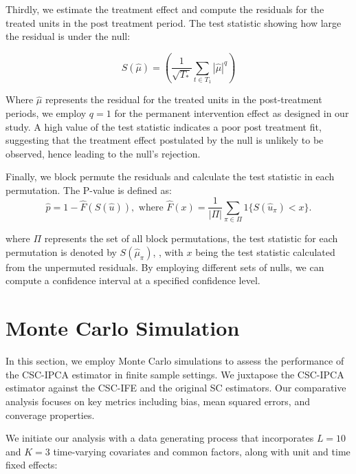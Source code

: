 \documentclass[12pt]{article}
\begin{document}
Thirdly, we estimate the treatment effect and compute the residuals for the treated units in the post treatment period. The test statistic showing how large the residual is under the null:

\begin{equation}
S(\hat{\mu}) = \left(\frac{1}{\sqrt{T_*}}\sum_{t \in T_1} |\hat{\mu}|^q \right)
\end{equation}

Where $\hat{\mu}$ represents the residual for the treated units in the post-treatment periods, we employ $q=1$ for the permanent intervention effect as designed in our study. A high value of the test statistic indicates a poor post treatment fit, suggesting that the treatment effect postulated by the null is unlikely to be observed, hence leading to the null's rejection. 

Finally, we block permute the residuals and calculate the test statistic in each permutation. The P-value is defined as:
\begin{equation}
\hat{p} = 1 - \hat{F}(S(\hat{u})), \text{ where } \hat{F}(x) = \frac{1}{|\Pi|} \sum_{\pi \in \Pi} 1\{S(\hat{u}_\pi) < x\}.
\end{equation}

\noindent where $\Pi$ represents the set of all block permutations, the test statistic for each permutation is denoted by $S(\hat{\mu}_{\pi})$, , with $x$ being the test statistic calculated from the unpermuted residuals. By employing different sets of nulls, we can compute a confidence interval at a specified confidence level.

\section{Monte Carlo Simulation}
\label{sec: simulation}

In this section, we employ Monte Carlo simulations to assess the performance of the CSC-IPCA estimator in finite sample settings. We juxtapose the CSC-IPCA estimator against the CSC-IFE and the original SC estimators. Our comparative analysis focuses on key metrics including bias, mean squared errors, and converage properties. 

We initiate our analysis with a data generating process that incorporates $L=10$ and $K=3$ time-varying covariates and common factors, along with unit and time fixed effects:
\end{document}
